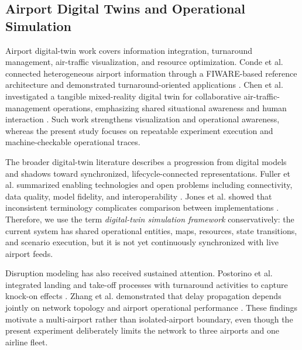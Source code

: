 \documentclass[runningheads]{llncs}
\begin{document}
\subsection{Airport Digital Twins and Operational Simulation}
Airport digital-twin work covers information integration, turnaround management, air-traffic visualization, and resource optimization. Conde et al. connected heterogeneous airport information through a FIWARE-based reference architecture and demonstrated turnaround-oriented applications \cite{conde2022}. Chen et al. investigated a tangible mixed-reality digital twin for collaborative air-traffic-management operations, emphasizing shared situational awareness and human interaction \cite{chen2024}. Such work strengthens visualization and operational awareness, whereas the present study focuses on repeatable experiment execution and machine-checkable operational traces.

The broader digital-twin literature describes a progression from digital models and shadows toward synchronized, lifecycle-connected representations. Fuller et al. summarized enabling technologies and open problems including connectivity, data quality, model fidelity, and interoperability \cite{fuller2020}. Jones et al. showed that inconsistent terminology complicates comparison between implementations \cite{jones2020}. Therefore, we use the term \emph{digital-twin simulation framework} conservatively: the current system has shared operational entities, maps, resources, state transitions, and scenario execution, but it is not yet continuously synchronized with live airport feeds.

Disruption modeling has also received sustained attention. Postorino et al. integrated landing and take-off processes with turnaround activities to capture knock-on effects \cite{postorino2020}. Zhang et al. demonstrated that delay propagation depends jointly on network topology and airport operational performance \cite{zhang2020}. These findings motivate a multi-airport rather than isolated-airport boundary, even though the present experiment deliberately limits the network to three airports and one airline fleet.
\end{document}
